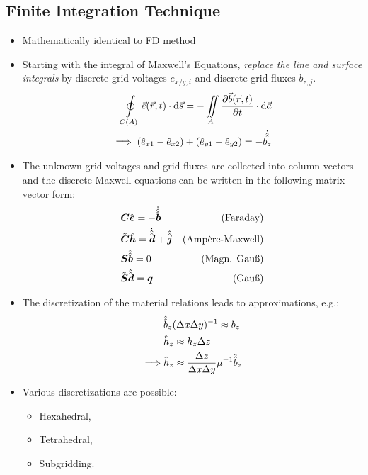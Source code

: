 \subsection{Finite Integration Technique}
\begin{itemize}
        \item Mathematically identical to FD method
        \item Starting with the integral of Maxwell's Equations, \textit{replace the line and surface integrals} by discrete grid voltages $e_{x/y,i}$ and discrete grid fluxes $b_{z,j}$.
        \begin{align*}
          \oint\limits_{C(A)} \vec{e}(\vec{r}, t)\cdot\mathrm{d}\vec{s} = -\iint\limits_{A}\dfrac{\partial\vec{b}(\vec{r}, t)}{\partial t}\cdot\mathrm{d}\vec{a}\\
          \implies (\hat{e}_{x1} - \hat{e}_{x2}) + (\hat{e}_{y1} - \hat{e}_{y2}) = -\dot{\hat{\hat{b_{z}}}}
        \end{align*}
  \item The unknown grid voltages and grid fluxes are collected into column vectors and the discrete Maxwell equations can be written in the following matrix-vector form:
        \begin{align*}
          &\boldsymbol{C} \hat{\boldsymbol{e}} = -\dot{\hat{\hat{\boldsymbol{b}}}} & \text{(Faraday)}\\
          &\tilde{\boldsymbol{C}} \hat{\boldsymbol{h}} = \dot{\hat{\hat{\boldsymbol{d}}}} + \hat{\hat{\boldsymbol{j}}} & \text{(Ampère-Maxwell)}\\
          &\boldsymbol{S} \hat{\hat{\boldsymbol{b}}} = 0 & \text{(Magn. Gauß)}\\
          &\tilde{\boldsymbol{S}} \hat{\hat{\boldsymbol{d}}} = \boldsymbol{q} & \text{(Gauß)}
        \end{align*}
  \item The discretization of the material relations leads to approximations, e.g.:
        \begin{align*}
          &\hat{\hat{b}}_{z}(\Delta x\Delta y)^{-1} \approx b_{z}\\
          &\hat{h}_{z} \approx h_{z}\Delta z\\
          \implies &\hat{h}_{z} \approx \dfrac{\Delta z}{\Delta x\Delta y}\mu^{-1}\hat{\hat{b}}_{z}
        \end{align*}
  \item Various discretizations are possible:
        \begin{itemize}
          \item Hexahedral,
          \item Tetrahedral,
          \item Subgridding.
        \end{itemize}
\end{itemize}
